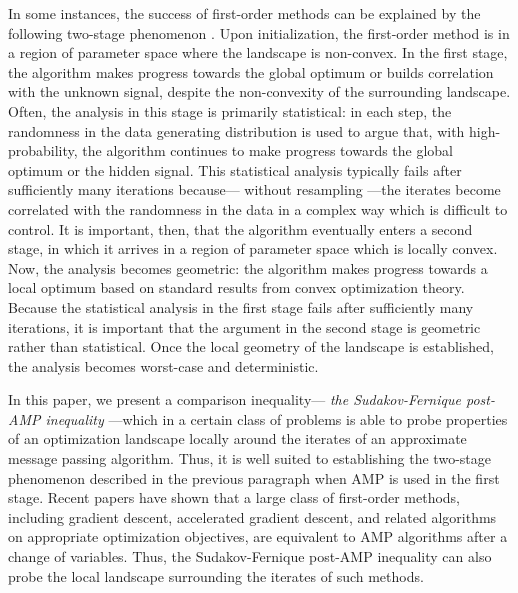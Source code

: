 \documentclass[]{article}
\begin{document}
In some instances, the success of first-order methods can be explained by the following two-stage phenomenon \cite{Chen2019,celentanoFanMei2021}.
Upon initialization,
the first-order method is in a region of parameter space where the landscape is non-convex.
In the first stage,
the algorithm makes progress towards the global optimum or builds correlation with the unknown signal,
despite the non-convexity of the surrounding landscape.
Often, 
the analysis in this stage is primarily statistical: 
in each step, the randomness in the data generating distribution is used to argue that, with high-probability, the algorithm continues to make progress towards the global optimum or the hidden signal. 
This statistical analysis typically fails after sufficiently many iterations because--- without resampling ---the iterates become correlated with the randomness in the data in a complex way which is difficult to control. 
It is important, then, that the algorithm eventually enters a second stage, in which it arrives in a region of parameter space which is locally convex.
Now,
the analysis becomes geometric:
the algorithm makes progress towards a local optimum based on standard results from convex optimization theory.
Because the statistical analysis in the first stage fails after sufficiently many iterations,
it is important that the argument in the second stage is geometric rather than statistical.
Once the local geometry of the landscape is established,
the analysis becomes worst-case and deterministic. 

In this paper, 
we present a comparison inequality--- \emph{the Sudakov-Fernique post-AMP inequality} ---which in a certain class of problems is able to probe properties of an optimization landscape locally around the iterates of an approximate message passing algorithm.
Thus, it is well suited to establishing the two-stage phenomenon described in the previous paragraph when AMP is used in the first stage.
Recent papers \cite{celentanoMontanari2020,montanariWu2022,celentanoCheng2021} have shown that a large class of first-order methods,
including gradient descent, accelerated gradient descent, and related algorithms on appropriate optimization objectives,
are equivalent to AMP algorithms after a change of variables.
Thus, the Sudakov-Fernique post-AMP inequality can also probe the local landscape surrounding the iterates of such methods.
\end{document}
